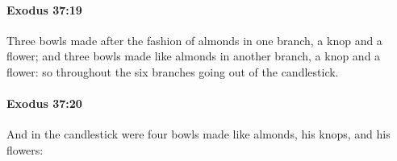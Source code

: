 		\paragraph{Exodus 37:19} %
			\label{EXODUS-37-19}

			Three bowls made after the fashion of almonds in one branch, a knop and a flower; and three bowls made like almonds in another branch, a knop and a flower: so throughout the six branches going out of the candlestick.


		\paragraph{Exodus 37:20} %
			\label{EXODUS-37-20}

			And in the candlestick were four bowls made like almonds, his knops, and his flowers:


